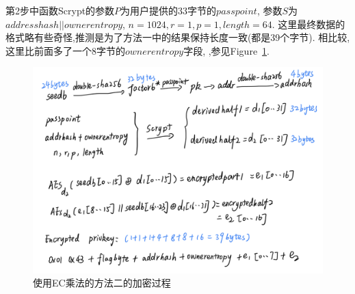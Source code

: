 第2步中函数Scrypt的参数$P$为用户提供的33字节的$passpoint$, 
参数$S$为$addresshash || ownerentropy$, $n=1024, r=1, p=1, length=64$.
这里最终数据的格式略有些奇怪,推测是为了方法一中的结果保持长度一致(都是39个字节).
相比较,这里比前面多了一个8字节的$ownerentropy$字段,
,参见Figure~\ref{fig-m2enc}.




\begin{figure}[h]
\centering
\includegraphics[width=.7\textwidth]{./ec.png}
\caption{使用EC乘法的方法二的加密过程}\label{fig-m2enc}
\end{figure}

